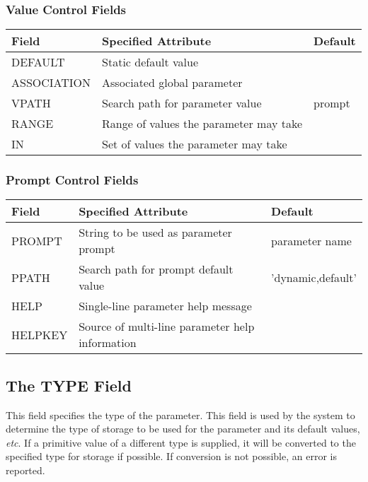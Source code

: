 \documentclass[twoside,11pt]{article}
\newcommand{\xlabel}[1]{}
\renewcommand{\_}{\texttt{\symbol{95}}}
\begin{document}
\subsubsection*{Value Control Fields}
\begin{center}
\begin{tabular}{|l|l|l|} \hline
Field & Specified Attribute & Default\\
\hline
DEFAULT & Static default value & \\
ASSOCIATION & Associated global parameter & \\
VPATH & Search path for parameter value & prompt\\
RANGE & Range of values the parameter may take & \\
IN & Set of values the parameter may take & \\
\hline
\end{tabular}
\end{center}

\subsubsection*{Prompt Control Fields}
\begin{center}
\begin{tabular}{|l|l|l|} \hline
Field & Specified Attribute & Default\\
\hline
PROMPT & String to be used as parameter prompt & parameter
name \\
PPATH & Search path for prompt default value & 'dynamic,default' \\
HELP & Single-line parameter help message & \\
HELPKEY & Source of multi-line parameter help information & \\
\hline
\end{tabular}
\end{center}

\subsection{The TYPE Field
\xlabel{the_type_field}\label{type}}

This field specifies the type of the parameter.
This field is used by the system to determine the type of storage to be
used for the parameter and its default values, {\em etc}.
If a primitive value of a different type is supplied,
it will be converted to the specified type for storage if possible.
If conversion is not possible, an error is reported.
\end{document}
